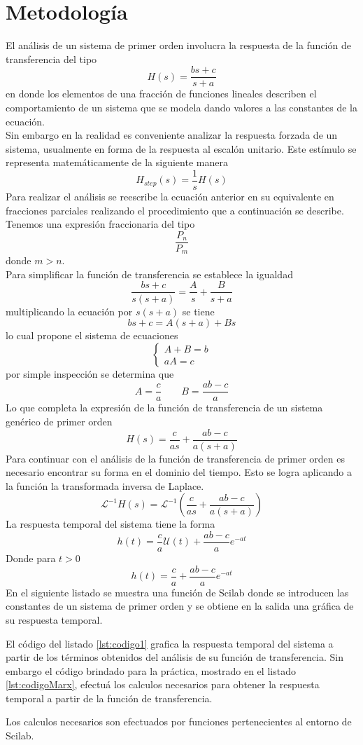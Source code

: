 \documentclass[letterpaper,11pt]{article}
\begin{document}
	\section{Metodología}
	El análisis de un sistema de primer orden involucra la respuesta de la función de transferencia del tipo
	\[H(s)=\frac{bs+c}{s+a}\]
	en donde los elementos de una fracción de funciones lineales describen el comportamiento de un sistema que se modela dando valores a las constantes de la ecuación.\\
	Sin embargo en la realidad es conveniente analizar la respuesta forzada de un sistema, usualmente en forma de la respuesta al escalón unitario. Este estímulo se representa matemáticamente de la siguiente manera
	\[H_{step}(s) = \frac{1}{s} H(s)\]
	Para realizar el análisis se reescribe la ecuación anterior en su equivalente en fracciones parciales realizando el procedimiento que a continuación se describe.\\
	Tenemos una expresión fraccionaria del tipo
	\[\frac{P_n}{P_m}\]
	donde $m > n$. \\
	Para simplificar la función de transferencia se establece la igualdad
	\[\frac{bs+c}{s\left(s+a\right)} = \frac{A}{s} + \frac{B}{s+a}\]
	multiplicando la ecuación por $s\left(s+a\right)$ se tiene
	\[bs+c = A\left(s+a\right) +Bs\]
	lo cual propone el sistema de ecuaciones\\
	\[
	\begin{cases}
	 A+B=b\\
	 aA=c
	\end{cases}
	\]
	por simple inspección se determina que
	\[A = \frac{c}{a}\qquad B=\frac{ab-c}{a}\]
	Lo que completa la expresión de la función de transferencia de un sistema genérico de primer orden
	\[H(s)=\frac{c}{as}+\frac{ab-c}{a\left(s+a\right)}\]
	Para continuar con el análisis de la función de transferencia de primer orden es necesario encontrar su forma en el dominio del tiempo. Esto se logra aplicando a la función la transformada inversa de Laplace.
	\[\mathscr{L}^{-1} H(s) = \mathscr{L}^{-1}\left(\frac{c}{as}+\frac{ab-c}{a\left(s+a\right)}\right) \]
	La respuesta temporal del sistema tiene la forma
	\[h(t)=\frac{c}{a}\mathscr{U}\left(t\right)+\frac{ab-c}{a}e^{-at}\]
	Donde para $t > 0$
	\[h(t)=\frac{c}{a}+\frac{ab-c}{a}e^{-at}\]
	En el siguiente listado se muestra una función de Scilab donde se introducen las constantes de un sistema de primer orden y se obtiene en la salida una gráfica de su respuesta temporal.
	 
	El código del listado \ref{lst:codigo1} grafica la respuesta temporal del sistema a partir de los términos obtenidos del análisis de su función de transferencia. Sin embargo el código brindado para la práctica, mostrado en el listado \ref{lst:codigoMarx}, efectuá los calculos necesarios para obtener la respuesta temporal a partir de la función de transferencia.
	
	Los calculos necesarios son efectuados por funciones pertenecientes al entorno de Scilab.
\end{document}
